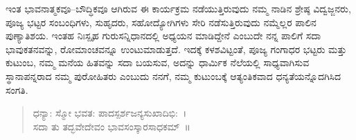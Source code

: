 ಇಂತ ಭಾವನಾತ್ಮಕವೂ–ಬೌದ್ಧಿಕವೂ ಆಗಿರುವ ಈ ಕಾರ್ಯಕ್ರಮ ನಡೆಯುತ್ತಿರುವುದು ನಮ್ಮ ನಾಡಿನ ಶ್ರೇಷ್ಠ ವಿದ್ವಜ್ಜನರು, ಪೂಜ್ಯ ಭಟ್ಟರ ಸಂಬಂಧಿಗಳು, ಸುಹೃದರು, ಸಹೋದ್ಯೋಗಿಗಳು ಸೇರಿ ನಡೆಸುತ್ತಿರುವುದು ನಮ್ಮೆಲ್ಲರ ಪಾಲಿನ ಪುಣ್ಯಾತಿಶಯ. ಇಂತಹ ನಿಃಸ್ಪೃಹ ಗುರುಸನ್ನಿಧಾನದಲ್ಲಿ ಅಧ್ಯಯನ ಮಾಡಿದ್ದೇನೆ ಎಂಬುದೇ ನನ್ನ ಪಾಲಿಗೆ ಸದಾ ಭಾವುಕತನವನ್ನು, ರೋಮಾಂಚವನ್ನೂ ಉಂಟುಮಾಡುತ್ತದೆ. ಇದಕ್ಕೆ ಕಳಶವಿಟ್ಟಂತೆ, ಪೂಜ್ಯ ಗಂಗಾಧರ ಭಟ್ಟರು ಮತ್ತು ಕುಟುಂಬ, ನಮ್ಮ ಮನೆಯ ಹಿತವನ್ನು ಸದಾ ಬಯಸುವ, ಅದನ್ನು ಧಾರ್ಮಿಕ ನೆಲೆಯಲ್ಲಿ ಸಾಧ್ಯವಾಗಿಸುವ ಸ್ಥಾನಾಪನ್ನರಾದ ನಮ್ಮ ಪುರೋಹಿತರು ಎಂಬುದು ನನಗೆ, ನಮ್ಮ ಕುಟುಂಬಕ್ಕೆ ಆತ್ಯಂತಿಕವಾದ ಧನ್ಯತೆಯನ್ನೊದಗಿಸಿದ ಸಂಗತಿ. 
\begin{verse}
ಧನ್ಯಾ: ಸ್ಮೋ ಭವತ: ಪಾದಸ್ಪರ್ಶಜನ್ಯಸುಖಾದಿಭಿ:~।\\
ಸದಾ ತು ತದ್ಭವೇದೇವಂ ಭಾವಸಂಸ್ಕಾರಸಾಧಕಮ್~॥
\end{verse}

\articleend	
